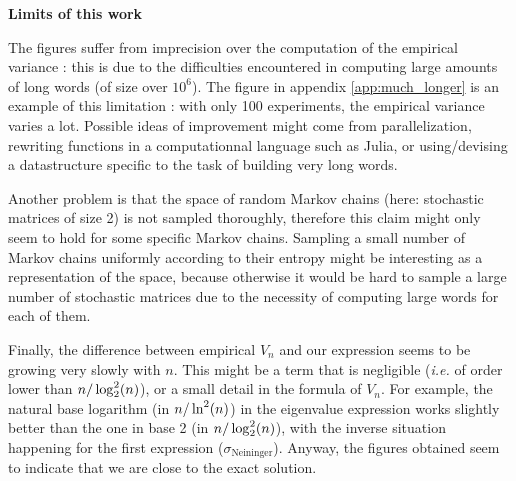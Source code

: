 \begin{remarque}
\noindent \textbf{Limits of this work}


The figures suffer from imprecision over the computation of the empirical 
variance : this is due to the difficulties encountered in computing large amounts
of long words (of size over $10^6$). The figure in appendix \ref{app:much_longer} is 
an example of this limitation : with only 100 experiments, the empirical variance 
varies a lot. Possible ideas of improvement might come from parallelization,
rewriting functions in a computationnal language such as Julia, or using/devising a datastructure
specific to the task of building very long words.

Another problem is that the space of random Markov chains (here: stochastic matrices
of size 2) is not sampled thoroughly, therefore this claim might only seem to hold for some
specific Markov chains. Sampling a small number of Markov chains uniformly
according to their entropy might be interesting as a representation of the space,
 because otherwise it would be hard to sample a large number of stochastic matrices
due to the necessity of computing large words for each of them.

Finally, the difference between empirical $V_n$ and our expression seems to be growing
very slowly with $n$. This might be a term that is negligible (\textit{i.e.} of 
order lower than $n/\log_2^2(n)$), or a small detail in the formula of $V_n$. 
For example, the natural base logarithm (in $n/\ln^2(n)$) in the eigenvalue expression works slightly
better than the one in base 2 (in $n/\log_2^2(n)$), with the inverse situation happening for the first 
expression ($\sigma_{\text{Neininger}}$). Anyway, the figures obtained seem to 
indicate that we are close to the exact solution.

\end{remarque}



 


